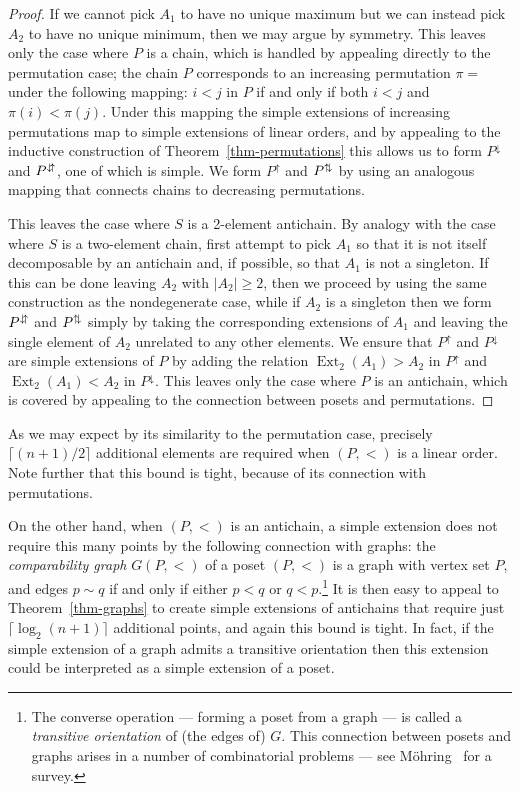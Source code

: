 \documentclass[11pt]{article}
\begin{document}
\begin{proof}
If we cannot pick $A_1$ to have no unique maximum but we can instead pick $A_2$ to have no unique minimum, then we may argue by symmetry. This leaves only the case where $P$ is a chain, which is handled by appealing directly to the permutation case; the chain $P$ corresponds to an increasing permutation $\pi=$ under the following mapping:  $i< j$ in $P$ if and only if both $i<j$ and $\pi(i)<\pi(j)$. Under this mapping the simple extensions of increasing permutations map to simple extensions of linear orders, and by appealing to the inductive construction of Theorem~\ref{thm-permutations} this allows us to form $P^\downarrow$ and $P^{{\downarrow\hspace{-2pt}\uparrow}}$, one of which is simple. We form $P^\uparrow$ and $P^{{\uparrow\hspace{-2pt}\downarrow}}$ by using an analogous mapping that connects chains to decreasing permutations.

This leaves the case where $S$ is a 2-element antichain. By analogy with the case where $S$ is a two-element chain, first attempt to pick $A_1$ so that it is not itself decomposable by an antichain and, if possible, so that $A_1$ is not a singleton. If this can be done leaving $A_2$ with $|A_2|\geq 2$, then we proceed by using the same construction as the nondegenerate case, while if $A_2$ is a singleton then we form $P^{{\downarrow\hspace{-2pt}\uparrow}}$ and $P^{{\uparrow\hspace{-2pt}\downarrow}}$ simply by taking the corresponding extensions of $A_1$ and leaving the single element of $A_2$ unrelated to any other elements. We ensure that $P^\uparrow$ and $P^\downarrow$ are simple extensions of $P$ by adding the relation ${\operatorname{Ext}}_2(A_1)>A_2$ in $P^\uparrow$ and ${\operatorname{Ext}}_2(A_1)<A_2$ in $P^\downarrow$. This leaves only the case where $P$ is an antichain, which is covered by appealing to the connection between posets and permutations.\end{proof}

As we may expect by its similarity to the permutation case, precisely $\lceil(n+1)/2\rceil$ additional elements are required when $(P,<)$ is a linear order.  Note further that this bound is tight, because of its connection with permutations.

On the other hand, when $(P,<)$ is an antichain, a simple extension does not require this many points by the following connection with graphs: the \emph{comparability graph} $G(P,<)$ of a poset $(P,<)$ is a graph with vertex set $P$, and edges $p\sim q$ if and only if either $p<q$ or $q<p$.\footnote{The converse operation --- forming a poset from a graph --- is called a \emph{transitive orientation} of (the edges of) $G$. This connection between posets and graphs arises in a number of combinatorial problems --- see M\"ohring~\cite{mohring:algorithmic-asp:} for a survey.} It is then easy to appeal to Theorem~\ref{thm-graphs} to create simple extensions of antichains that require just $\lceil\log_2 (n+1)\rceil$ additional points, and again this bound is tight. In fact, if the simple extension of a graph admits a transitive orientation then this extension could be interpreted as a simple extension of a poset.
\end{document}
